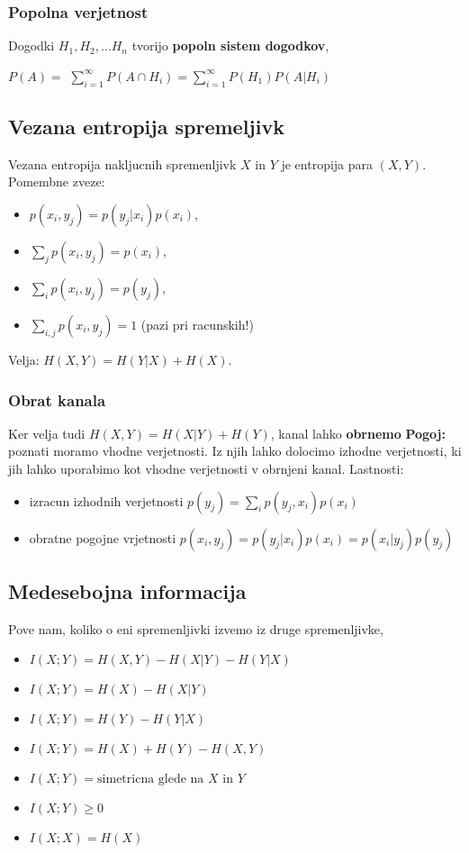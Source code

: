 \documentclass{article}
\begin{document}
\begin{multicols}{4}
\subsubsection{Popolna verjetnost}
Dogodki $H_{1}, H_{2}, \dots H_{n}$ tvorijo \textbf{popoln sistem dogodkov},
\begin{center}
    \begin{math}
        P(A) =
    \end{math}
    \smallskip
    \begin{math}
        \sum_{i=1}^{\infty} P(A \cap H_{i}) =
        \sum_{i=1}^{\infty} P(H_{1}) P(A | H_{i})
    \end{math}
\end{center}

\subsection{Vezana entropija spremeljivk}
Vezana entropija nakljucnih spremenljivk $X$ in $Y$ je entropija para $(X, Y)$.
Pomembne zveze:
\begin{itemize}
    \item $p(x_i, y_j) = p(y_j| x_i)p(x_i)$,
    \item $\sum_j p(x_i, y_j) = p(x_i)$,
    \item $\sum_i p(x_i, y_j) = p(y_j)$,
    \item $\sum_{i,j} p(x_i, y_j) = 1$ (pazi pri racunskih!)
\end{itemize}
Velja: $H(X, Y) = H(Y|X) + H(X)$.
\subsubsection{Obrat kanala}
Ker velja tudi $H(X, Y) = H(X|Y) + H(Y)$, kanal lahko \textbf{obrnemo}
\textbf{Pogoj:}  poznati moramo vhodne verjetnosti. Iz njih lahko dolocimo izhodne verjetnosti, ki jih lahko
uporabimo kot vhodne verjetnosti v obrnjeni kanal.
Lastnosti:
\begin{itemize}
    \item izracun izhodnih verjetnosti $p(y_j) = \sum_i p(y_j, x_i)p(x_i)$
    \item obratne pogojne vrjetnosti $p(x_i, y_j)= p(y_j|x_i)p(x_i) = p(x_i|y_j)p(y_j)$
\end{itemize}

\subsection{Medesebojna informacija}
Pove nam, koliko o eni spremenljivki izvemo iz druge spremenljivke,
\begin{itemize}
    \item $I(X;Y) = H(X, Y) - H(X|Y) - H(Y|X)$
    \item $I(X;Y) = H(X) - H(X|Y)$
    \item $I(X;Y) = H(Y) - H(Y|X)$
    \item $I(X;Y) = H(X) + H(Y) - H(X, Y)$
    \item $I(X;Y) = \text{simetricna glede na } X \text{ in } Y$
    \item $I(X;Y) \geq 0$
    \item $I(X;X) = H(X)$
\end{itemize}


\end{multicols}
\end{document}
